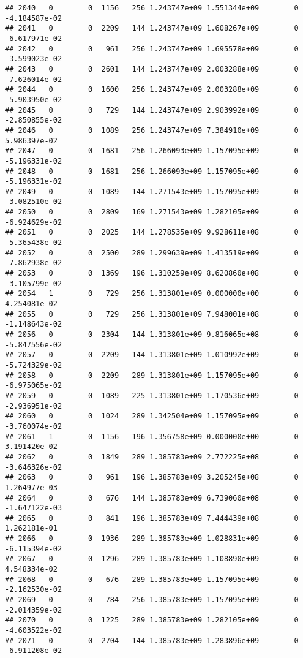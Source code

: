 \documentclass[
]{article}
\begin{document}
\begin{enumerate}
\begin{verbatim}
## 2040   0        0  1156   256 1.243747e+09 1.551344e+09        0 -4.184587e-02
## 2041   0        0  2209   144 1.243747e+09 1.608267e+09        0 -6.617971e-02
## 2042   0        0   961   256 1.243747e+09 1.695578e+09        0 -3.599023e-02
## 2043   0        0  2601   144 1.243747e+09 2.003288e+09        0 -7.626014e-02
## 2044   0        0  1600   256 1.243747e+09 2.003288e+09        0 -5.903950e-02
## 2045   0        0   729   144 1.243747e+09 2.903992e+09        0 -2.850855e-02
## 2046   0        0  1089   256 1.243747e+09 7.384910e+09        0  5.986397e-02
## 2047   0        0  1681   256 1.266093e+09 1.157095e+09        0 -5.196331e-02
## 2048   0        0  1681   256 1.266093e+09 1.157095e+09        0 -5.196331e-02
## 2049   0        0  1089   144 1.271543e+09 1.157095e+09        0 -3.082510e-02
## 2050   0        0  2809   169 1.271543e+09 1.282105e+09        0 -6.924629e-02
## 2051   0        0  2025   144 1.278535e+09 9.928611e+08        0 -5.365438e-02
## 2052   0        0  2500   289 1.299639e+09 1.413519e+09        0 -7.862938e-02
## 2053   0        0  1369   196 1.310259e+09 8.620860e+08        0 -3.105799e-02
## 2054   1        0   729   256 1.313801e+09 0.000000e+00        0  4.254081e-02
## 2055   0        0   729   256 1.313801e+09 7.948001e+08        0 -1.148643e-02
## 2056   0        0  2304   144 1.313801e+09 9.816065e+08        0 -5.847556e-02
## 2057   0        0  2209   144 1.313801e+09 1.010992e+09        0 -5.724329e-02
## 2058   0        0  2209   289 1.313801e+09 1.157095e+09        0 -6.975065e-02
## 2059   0        0  1089   225 1.313801e+09 1.170536e+09        0 -2.936951e-02
## 2060   0        0  1024   289 1.342504e+09 1.157095e+09        0 -3.760074e-02
## 2061   1        0  1156   196 1.356758e+09 0.000000e+00        0  3.191420e-02
## 2062   0        0  1849   289 1.385783e+09 2.772225e+08        0 -3.646326e-02
## 2063   0        0   961   196 1.385783e+09 3.205245e+08        0  1.264977e-03
## 2064   0        0   676   144 1.385783e+09 6.739060e+08        0 -1.647122e-03
## 2065   0        0   841   196 1.385783e+09 7.444439e+08        0  1.262181e-01
## 2066   0        0  1936   289 1.385783e+09 1.028831e+09        0 -6.115394e-02
## 2067   0        0  1296   289 1.385783e+09 1.108890e+09        0  4.548334e-02
## 2068   0        0   676   289 1.385783e+09 1.157095e+09        0 -2.162530e-02
## 2069   0        0   784   256 1.385783e+09 1.157095e+09        0 -2.014359e-02
## 2070   0        0  1225   289 1.385783e+09 1.282105e+09        0 -4.603522e-02
## 2071   0        0  2704   144 1.385783e+09 1.283896e+09        0 -6.911208e-02

\end{verbatim}
\end{enumerate}
\end{document}

